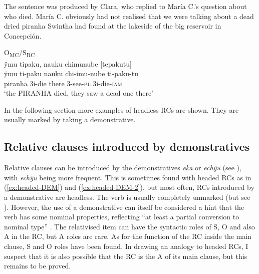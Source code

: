 The sentence was produced by Clara, who replied to María C.’s question about who died. María C. obviously had not realised that we were talking about a dead dried piranha Swintha had found at the lakeside of the big reservoir in Concepción.

\ea\label{ex:RCiii}
\begingl
\glpreamble \textup{O\textsubscript{MC}/S\textsubscript{RC}}\\ÿmu tipaku, nauku chimunube \textup{[}tepakutu\textup{]}\\
\gla ÿmu ti-paku nauku chi-imu-nube ti-paku-tu\\
\glb piranha 3i-die there 3-see-\textsc{pl} 3i-die-\textsc{iam}\\
\glft ‘the PIRANHA died, they saw a dead one there’
\endgl
\trailingcitation{[cux-c120414ls-1.236]}
\xe{}

In the following section more examples of headless RCs are shown. They are usually marked by taking a demonstrative.


%



\subsection{Relative clauses introduced by demonstratives}\label{sec:HeadlessRC}

Relative clauses can be introduced by the demonstratives \textit{eka} or \textit{echÿu} (see ), with \textit{echÿu} being more frequent. This is sometimes found with headed RCs as in (\ref{ex:headed-DEM}) and (\ref{ex:headed-DEM-2}), but most often, RCs introduced by a demonstrative are headless. The verb is usually completely unmarked (but see ). However, the use of a demonstrative can itself be considered a hint that the verb has some nominal properties, reflecting “at least a partial conversion to nominal type” \citep[232]{Andrews2007}. The relativised item can have the syntactic roles of S, O and also A in the RC, but A roles are rare. As for the function of the RC inside the main clause, S and O roles have been found. In drawing an analogy to headed RCs, I suspect that it is also possible that the RC is the A of its main clause, but this remains to be proved. 

